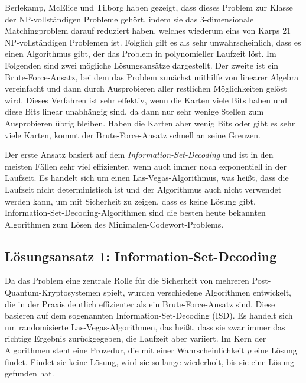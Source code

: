 \documentclass[a4paper,10pt,ngerman]{scrartcl}
\begin{document}
Berlekamp, McElice und Tilborg \cite{berlekampInherentIntractabilityCertain1978} haben gezeigt, dass dieses Problem zur Klasse der NP-vollständigen Probleme gehört, indem sie das 3-dimensionale Matchingproblem darauf reduziert haben, welches wiederum eins von Karps 21 NP-vollständigen Problemen ist.
Folglich gilt es als sehr unwahrscheinlich, dass es einen Algorithmus gibt, der das Problem in polynomieller Laufzeit löst. 
Im Folgenden sind zwei mögliche Lösungsansätze dargestellt. 
Der zweite ist ein Brute-Force-Ansatz, bei dem das Problem zunächst mithilfe von linearer Algebra vereinfacht und dann durch Ausprobieren aller restlichen Möglichkeiten gelöst wird.
Dieses Verfahren ist sehr effektiv, wenn die Karten viele Bits haben und diese Bits linear unabhängig sind, da dann nur sehr wenige Stellen zum Ausprobieren übrig bleiben. Haben die Karten aber wenig Bits oder gibt es sehr viele Karten, kommt der Brute-Force-Ansatz schnell an seine Grenzen.

Der erste Ansatz basiert auf dem \textit{Information-Set-Decoding} und ist in den meisten Fällen sehr viel effizienter, wenn auch immer noch exponentiell in der Laufzeit. Es handelt sich um einen Las-Vegas-Algorithmus, was heißt, dass die Laufzeit nicht deterministisch ist und der Algorithmus auch nicht verwendet werden kann, um mit Sicherheit zu zeigen, dass es keine Lösung gibt. 
Information-Set-Decoding-Algorithmen sind die besten heute bekannten Algorithmen zum Lösen des Minimalen-Codewort-Problems.

\subsection{Lösungsansatz 1: Information-Set-Decoding}
Da das Problem eine zentrale Rolle für die Sicherheit von mehreren Post-Quantum-Kryptosystemen spielt, wurden verschiedene Algorithmen entwickelt, die in der Praxis deutlich effizienter als ein Brute-Force-Ansatz sind. 
Diese basieren auf dem sogenannten Information-Set-Decoding (ISD). 
Es handelt sich um randomisierte Las-Vegas-Algorithmen, das heißt, dass sie zwar immer das richtige Ergebnis zurückgegeben, die Laufzeit aber variiert. 
Im Kern der Algorithmen steht eine Prozedur, die mit einer Wahrscheinlichkeit $p$ eine Lösung findet. Findet sie keine Lösung, wird sie so lange wiederholt, bis sie eine Lösung gefunden hat. 
\end{document}
